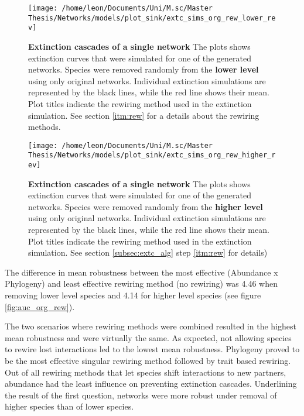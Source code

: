 \documentclass[12pt,a4paper]{article}
\begin{document}
\begin{figure}[H]
	 \centering
	 \texttt{[image: /home/leon/Documents/Uni/M.sc/Master Thesis/Networks/models/plot\_sink/extc\_sims\_org\_rew\_lower\_rev]}
	 \captionsetup{width = \textwidth}
	 \caption{\textbf{Extinction cascades of a single network} The plots shows extinction curves that were simulated for one of the generated networks. Species were removed randomly from the \textbf{lower level} using only original networks. Individual extinction simulations are represented by the black lines, while the red line shows their mean. Plot titles indicate the rewiring method used in the extinction simulation. See section \ref{itm:rew} for a details about the rewiring methods.}
	 \label{fig:extc_org_rew_lower}
\end{figure}


\begin{figure}[H]
	 \centering
	 \texttt{[image: /home/leon/Documents/Uni/M.sc/Master Thesis/Networks/models/plot\_sink/extc\_sims\_org\_rew\_higher\_rev]}
	 \captionsetup{width = \textwidth}
	 \caption{\textbf{Extinction cascades of a single network} The plots shows extinction curves that were simulated for one of the generated networks. Species were removed randomly from the \textbf{higher level} using only original networks. Individual extinction simulations are represented by the black lines, while the red line shows their mean. Plot titles indicate the rewiring method used in the extinction simulation. See section \ref{subsec:extc_alg} step \ref{itm:rew} for details)}
	 \label{fig:extc_org_rew_higher}
\end{figure}

The difference in mean robustness between the most effective (Abundance x Phylogeny) and least effective rewiring method (no rewiring) was 4.46 when removing lower level species and 4.14 for higher level species (see figure \ref{fig:auc_org_rew}). 

The two scenarios where rewiring methods were combined resulted in the highest mean robustness and were virtually the same. As expected, not allowing species to rewire lost interactions led to the lowest mean robustness. Phylogeny proved to be the most effective singular rewiring method followed by trait based rewiring. Out of all rewiring methods that let species shift interactions to new partners, abundance had the least influence on preventing extinction cascades. 
Underlining the result of the first question, networks were more robust under removal of higher species than of lower species. \par 
\end{document}
